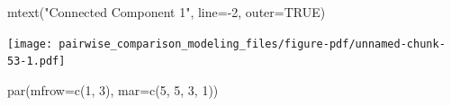 \documentclass[
  letterpaper,
  DIV=11,
  numbers=noendperiod]{scrartcl}
\newenvironment{Shaded}{\begin{snugshade}}{\end{snugshade}}
\newcommand{\AttributeTok}[1]{\textcolor[rgb]{0.40,0.45,0.13}{#1}}
\newcommand{\ConstantTok}[1]{\textcolor[rgb]{0.56,0.35,0.01}{#1}}
\newcommand{\DecValTok}[1]{\textcolor[rgb]{0.68,0.00,0.00}{#1}}
\newcommand{\FunctionTok}[1]{\textcolor[rgb]{0.28,0.35,0.67}{#1}}
\newcommand{\NormalTok}[1]{\textcolor[rgb]{0.00,0.23,0.31}{#1}}
\newcommand{\SpecialCharTok}[1]{\textcolor[rgb]{0.37,0.37,0.37}{#1}}
\newcommand{\StringTok}[1]{\textcolor[rgb]{0.13,0.47,0.30}{#1}}
\begin{document}
\begin{Shaded}
\begin{Highlighting}[]
\FunctionTok{mtext}\NormalTok{(}\StringTok{"Connected Component 1"}\NormalTok{, }\AttributeTok{line=}\SpecialCharTok{{-}}\DecValTok{2}\NormalTok{, }\AttributeTok{outer=}\ConstantTok{TRUE}\NormalTok{)}
\end{Highlighting}
\end{Shaded}

\texttt{[image: pairwise\_comparison\_modeling\_files/figure-pdf/unnamed-chunk-53-1.pdf]}

\begin{Shaded}
\begin{Highlighting}[]
\FunctionTok{par}\NormalTok{(}\AttributeTok{mfrow=}\FunctionTok{c}\NormalTok{(}\DecValTok{1}\NormalTok{, }\DecValTok{3}\NormalTok{), }\AttributeTok{mar=}\FunctionTok{c}\NormalTok{(}\DecValTok{5}\NormalTok{, }\DecValTok{5}\NormalTok{, }\DecValTok{3}\NormalTok{, }\DecValTok{1}\NormalTok{))}


\end{Highlighting}
\end{Shaded}
\end{document}
